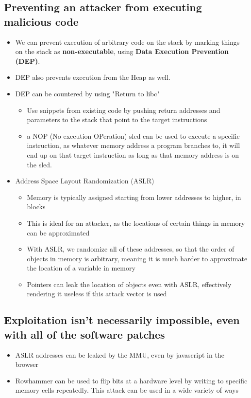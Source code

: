 \documentclass{article}
\begin{document}
\subsection{Preventing an attacker from executing malicious code}
\begin{itemize}
    \item We can prevent execution of arbitrary code on the stack by marking things on the stack as \textbf{non-executable}, using \textbf{Data Execution Prevention (DEP)}.
    \item DEP also prevents execution from the Heap as well.
    \item DEP can be countered by using "Return to libc"
    \begin{itemize}
        \item Use snippets from existing code by pushing return addresses and parameters to the stack that point to the target instructions
        \item a NOP (No execution OPeration) sled can be used to execute a specific instruction, as whatever memory address a program branches to, it will end up on that target instruction as long as that memory address is on the sled.
    \end{itemize}
    \item Address Space Layout Randomization (ASLR)
        \begin{itemize}
            \item Memory is typically assigned starting from lower addresses to higher, in blocks
            \item This is ideal for an attacker, as the locations of certain things in memory can be approximated
            \item With ASLR, we randomize all of these addresses, so that the order of objects in memory is arbitrary, meaning it is much harder to approximate the location of a variable in memory
            \item Pointers can leak the location of objects even with ASLR, effectively rendering it useless if this attack vector is used
        \end{itemize}
\end{itemize}
\subsection{Exploitation isn't necessarily impossible, even with all of the software patches}
\begin{itemize}
    \item ASLR addresses can be leaked by the MMU, even by javascript in the browser
    \item Rowhammer can be used to flip bits at a hardware level by writing to specific memory cells repeatedly. This attack can be used in a wide variety of ways
\end{itemize}
\end{document}
